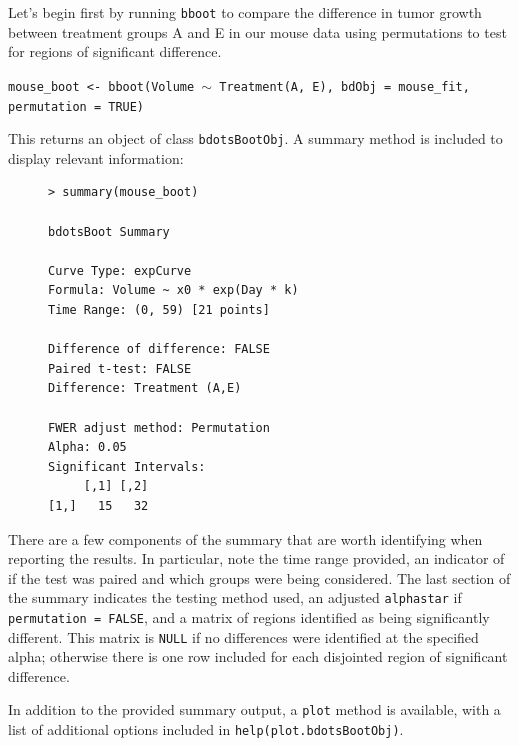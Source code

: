 \documentclass{article}
\newcommand{\xt}{\texttt}%
\begin{document}
Let's begin first by running \xt{bboot} to compare the difference in tumor growth between treatment groups A and E in our mouse data using permutations to test for regions of significant difference. 
\begin{center}
\tt mouse\_boot <- bboot(Volume $\sim$ Treatment(A, E), bdObj = mouse\_fit, permutation = TRUE)
\end{center}
This returns an object of class \xt{bdotsBootObj}. A summary method is included to display relevant information:
\begin{singlespace}
\begin{figure}[H]
\centering
\begin{BVerbatim}
> summary(mouse_boot)

bdotsBoot Summary

Curve Type: expCurve 
Formula: Volume ~ x0 * exp(Day * k) 
Time Range: (0, 59) [21 points]

Difference of difference: FALSE 
Paired t-test: FALSE 
Difference: Treatment (A,E)

FWER adjust method: Permutation 
Alpha: 0.05 
Significant Intervals:
     [,1] [,2]
[1,]   15   32
\end{BVerbatim}
\end{figure}
\end{singlespace}

There are a few components of the summary that are worth identifying when reporting the results. In particular, note the time range provided, an indicator of if the test was paired and which groups were being considered. The last section of the summary indicates the testing method used, an adjusted \xt{alphastar} if \xt{permutation = FALSE}, and a matrix of regions identified as being significantly different. This matrix is \xt{NULL} if no differences were identified at the specified alpha; otherwise there is one row included for each disjointed region of significant difference.

In addition to the provided summary output, a \xt{plot} method is available, with a list of additional options included in \xt{help(plot.bdotsBootObj)}.
\end{document}
